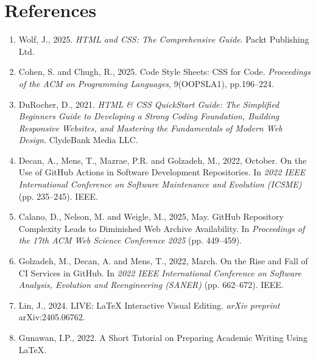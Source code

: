 \documentclass[11pt,a4paper]{article}
\begin{document}
\section*{References}

\begin{enumerate}
    \item Wolf, J., 2025. \textit{HTML and CSS: The Comprehensive Guide}. Packt Publishing Ltd.
    \item Cohen, S. and Chugh, R., 2025. Code Style Sheets: CSS for Code. \textit{Proceedings of the ACM on Programming Languages}, 9(OOPSLA1), pp.196–224.
    \item DuRocher, D., 2021. \textit{HTML \& CSS QuickStart Guide: The Simplified Beginners Guide to Developing a Strong Coding Foundation, Building Responsive Websites, and Mastering the Fundamentals of Modern Web Design}. ClydeBank Media LLC.
    \item Decan, A., Mens, T., Mazrae, P.R. and Golzadeh, M., 2022, October. On the Use of GitHub Actions in Software Development Repositories. In \textit{2022 IEEE International Conference on Software Maintenance and Evolution (ICSME)} (pp. 235–245). IEEE.
    \item Calano, D., Nelson, M. and Weigle, M., 2025, May. GitHub Repository Complexity Leads to Diminished Web Archive Availability. In \textit{Proceedings of the 17th ACM Web Science Conference 2025} (pp. 449–459).
    \item Golzadeh, M., Decan, A. and Mens, T., 2022, March. On the Rise and Fall of CI Services in GitHub. In \textit{2022 IEEE International Conference on Software Analysis, Evolution and Reengineering (SANER)} (pp. 662–672). IEEE.
    \item Lin, J., 2024. LIVE: LaTeX Interactive Visual Editing. \textit{arXiv preprint} arXiv:2405.06762.
    \item Gunawan, I.P., 2022. A Short Tutorial on Preparing Academic Writing Using LaTeX.
\end{enumerate}
\end{document}
